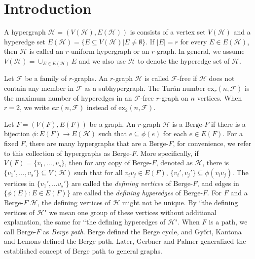 \documentclass[12pt]{article}%
\newcommand{\ber}{\text{Berge-}}
\newcommand{\mh}{\mathcal{H}}
\begin{document}
\section{Introduction}
A hypergraph $\mh=(V(\mh),E(\mh))$ is consists of a vertex set $V(\mh)$ and a hyperedge set $E(\mh)=\{E\subseteq V(\mh)|E\neq\emptyset\}$. If $|E|=r$ for every $E\in E(\mh)$, then $\mh$ is called an $r$-uniform hypergraph or an $r$-graph. In general, we assume $V(\mh)=\cup_{E\in E(\mh)}E$ and we also use $\mh$ to denote the hyperedge set of $\mh$.
\par
Let $\mathcal{F}$ be a family of $r$-graphs. An $r$-graph $\mathcal{H}$ is called $\mathcal{F}$-free if $\mh$ does not contain any member in $\mathcal{F}$ as a subhypergraph. The Tur\'an number $\mathrm{ex}_{r}(n,\mathcal{F})$ is the maximum number of hyperedges in an $\mathcal{F}$-free $r$-graph on $n$ vertices. When $r=2$, we write $ex(n,\mathcal{F})$ instead of $\mathrm{ex}_{2}(n,\mathcal{F})$.
\par
Let $F=(V(F),E(F))$ be a graph. An $r$-graph $\mathcal{H}$ is a $\ber F$ if there is a bijection $\phi:E(F)\to E(\mh)$ such that $e \subseteq \phi(e)$ for each $e\in E(F)$. For a fixed $F$, there are many hypergraphs that are a $\ber F$, for convenience, we refer to this collection of hypergraphs as $\ber F$.
More specifically, if $V(F)=\{v_1,\ldots,v_s\}$, then for any copy of $\ber F$, denoted as $\mh$, there is $\{v_{1}',\ldots,v_{s}'\}\subseteq V(\mh)$ such that for all $v_i v_j\in E(F)$, $\{v_i',v_j'\}\subseteq \phi(v_i v_j)$. The vertices in $\{v_1',\dots v_s'\}$ are called the \emph{defining vertices} of $\ber F$, and edges in $\{\phi(E):E\in E(F)\}$ are called the \emph{defining hyperedges} of $\ber F$. For $F$ and a $\ber F$ $\mh$, the defining vertices of $\mh$ might not be unique. By ``the defining vertices of $\mh$" we mean one group of these vertices without additional explanation, the same for ``the defining hyperedges of $\mh$". When $F$ is a path, we call $\ber F$ as \emph{Berge path}.
 Berge \cite{berge1984hypergraphs} defined the Berge cycle, and Gy\H{o}ri, Kantona and Lemons \cite{gyHori2016hypergraph} defined the Berge path. Later, Gerbner and Palmer \cite{gerbner2017extremal} generalized the established concept of Berge path to general graphs.
\end{document}

